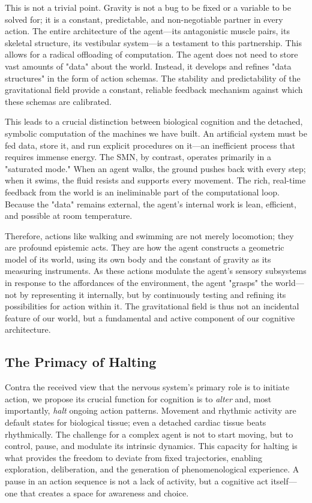 This is not a trivial point. Gravity is not a bug to be fixed or a variable to be solved for; it is a constant, predictable, and non-negotiable partner in every action. The entire architecture of the agent—its antagonistic muscle pairs, its skeletal structure, its vestibular system—is a testament to this partnership. This allows for a radical offloading of computation. The agent does not need to store vast amounts of "data" about the world. Instead, it develops and refines "data structures" in the form of action schemas. The stability and predictability of the gravitational field provide a constant, reliable feedback mechanism against which these schemas are calibrated.

This leads to a crucial distinction between biological cognition and the detached, symbolic computation of the machines we have built. An artificial system must be fed data, store it, and run explicit procedures on it—an inefficient process that requires immense energy. The SMN, by contrast, operates primarily in a "saturated mode." When an agent walks, the ground pushes back with every step; when it swims, the fluid resists and supports every movement. The rich, real-time feedback from the world is an ineliminable part of the computational loop. Because the "data" remains external, the agent's internal work is lean, efficient, and possible at room temperature.

Therefore, actions like walking and swimming are not merely locomotion; they are profound epistemic acts. They are how the agent constructs a geometric model of its world, using its own body and the constant of gravity as its measuring instruments. As these actions modulate the agent's sensory subsystems in response to the affordances of the environment, the agent "grasps" the world—not by representing it internally, but by continuously testing and refining its possibilities for action within it. The gravitational field is thus not an incidental feature of our world, but a fundamental and active component of our cognitive architecture.

\subsection*{The Primacy of Halting}
Contra the received view that the nervous system's primary role is to initiate action, we propose its crucial function for cognition is to \textit{alter} and, most importantly, \textit{halt} ongoing action patterns. Movement and rhythmic activity are default states for biological tissue; even a detached cardiac tissue beats rhythmically. The challenge for a complex agent is not to start moving, but to control, pause, and modulate its intrinsic dynamics. This capacity for halting is what provides the freedom to deviate from fixed trajectories, enabling exploration, deliberation, and the generation of phenomenological experience. A pause in an action sequence is not a lack of activity, but a cognitive act itself—one that creates a space for awareness and choice.

